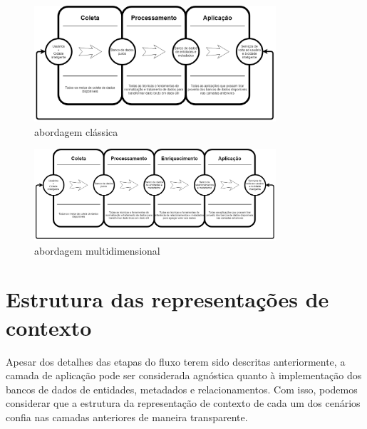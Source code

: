 \begin{figure}[h]
\caption{abordagem clássica}
\centering
\includegraphics[width=0.8\textwidth]{images/PoorFlow.png}
\end{figure}

\begin{figure}[h]
\caption{abordagem multidimensional}
\centering
\includegraphics[width=0.8\textwidth]{images/FullFlow.png}
\end{figure}

\section{Estrutura das representações de contexto}

Apesar dos detalhes das etapas do fluxo terem sido descritas anteriormente, a camada de aplicação pode ser considerada agnóstica quanto à implementação dos bancos de dados de entidades, metadados e relacionamentos. Com isso, podemos considerar que a estrutura da representação de contexto de cada um dos cenários confia nas camadas anteriores de maneira transparente.

